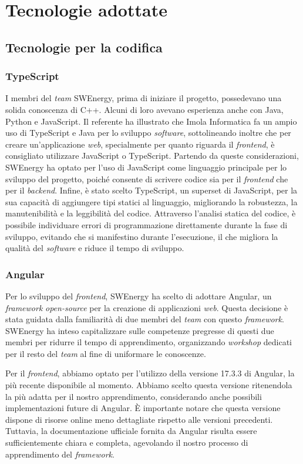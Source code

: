 \section{Tecnologie adottate}

\subsection{Tecnologie per la codifica}

\subsubsection{TypeScript}
I membri del \textit{team} SWEnergy, prima di iniziare il progetto, possedevano una
solida conoscenza di C++. Alcuni di loro avevano esperienza anche con Java,
Python e JavaScript. Il referente ha illustrato che Imola Informatica fa un
ampio uso di TypeScript e Java per lo sviluppo \textit{software}, sottolineando
inoltre che per creare un'applicazione \textit{web}, specialmente per quanto riguarda il
\textit{frontend}, è consigliato utilizzare JavaScript o TypeScript. Partendo da
queste considerazioni, SWEnergy ha optato per l'uso di JavaScript come
linguaggio principale per lo sviluppo del progetto, poiché consente di scrivere
codice sia per il \textit{frontend} che per il \textit{backend}. Infine, è stato
scelto TypeScript, un superset di JavaScript, per la sua capacità di aggiungere
tipi statici al linguaggio, migliorando la robustezza, la manutenibilità e la
leggibilità del codice. Attraverso l'analisi statica del codice, è possibile
individuare errori di programmazione direttamente durante la fase di sviluppo,
evitando che si manifestino durante l'esecuzione, il che migliora la qualità del
\textit{software} e riduce il tempo di sviluppo.


\subsubsection{Angular}
Per lo sviluppo del \textit{frontend}, SWEnergy ha scelto di adottare Angular,
un \textit{framework} \textit{open-source} per la creazione di applicazioni \textit{web}. Questa
decisione è stata guidata dalla familiarità di due membri del \textit{team} con questo
\textit{framework}. SWEnergy ha inteso capitalizzare sulle competenze pregresse
di questi due membri per ridurre il tempo di apprendimento, organizzando
\textit{workshop} dedicati per il resto del \textit{team} al fine di uniformare le
conoscenze.

Per il \textit{frontend}, abbiamo optato per l'utilizzo della versione 17.3.3 di
Angular, la più recente disponibile al momento. Abbiamo scelto questa versione
ritenendola la più adatta per il nostro apprendimento, considerando anche
possibili implementazioni future di Angular. È importante notare che questa
versione dispone di risorse online meno dettagliate rispetto alle versioni precedenti.
Tuttavia, la documentazione ufficiale fornita da Angular risulta essere sufficientemente chiara e completa, agevolando il
nostro processo di apprendimento del \textit{framework}.


